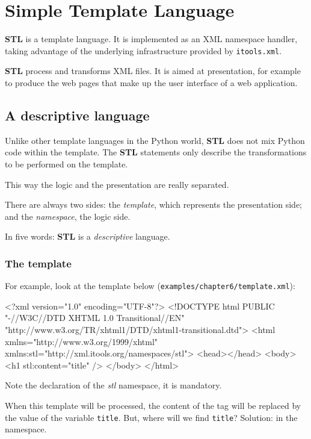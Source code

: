 \chapter{Simple Template Language}
\label{Chapter: STL}

{\bf STL} is a template language. It is implemented as an XML namespace
handler, taking advantage of the underlying infrastructure provided by
{\tt itools.xml}.

{\bf STL} process and transforms XML files. It is aimed at presentation,
for example to produce the web pages that make up the user interface of
a web application.


\section{A descriptive language}

Unlike other template languages in the Python world, {\bf STL} does not
mix Python code within the template. The {\bf STL} statements only describe
the transformations to be performed on the template.

This way the logic and the presentation are really separated.

There are always two sides: the {\em template}, which represents the
presentation side; and the {\em namespace}, the logic side.

In five words: {\bf STL} is a {\em descriptive} language.

\subsection{The template}

For example, look at the template below ({\tt examples/chapter6/template.xml}):

\begin{code}
    <?xml version="1.0" encoding="UTF-8"?>
    <!DOCTYPE html
         PUBLIC "-//W3C//DTD XHTML 1.0 Transitional//EN"
         "http://www.w3.org/TR/xhtml1/DTD/xhtml1-transitional.dtd">
    <html xmlns="http://www.w3.org/1999/xhtml"
          xmlns:stl="http://xml.itools.org/namespaces/stl">
      <head></head>
      <body>
        <h1 stl:content="title" />
      </body>
    </html>
\end{code}

Note the declaration of the {\em stl} namespace, it is mandatory.

When this template will be processed, the content of the {\tt <h1>} tag
will be replaced by the value of the variable {\tt title}. But, where will
we find {\tt title}? Solution: in the namespace.

